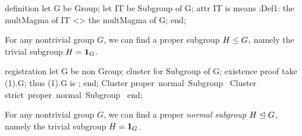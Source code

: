 \nwenddocs{}\endmoddef\nwstartdeflinemarkup{}\nwenddeflinemarkup
definition
  let G be Group;
  let IT be Subgroup of G;
  attr IT is  means
  :Def1:
  the multMagma of IT <> the multMagma of G;
end;
\eatline
{}\nwendcode{}\nwdocspar
\begin{registration}
For any nontrivial group $G$, we can find a proper subgroup $H\leq G$,
namely the trivial subgroup $H=\mathbf{1}_{G}$.
\end{registration}

\nwenddocs{}\endmoddef\nwstartdeflinemarkup{}\nwenddeflinemarkup
registration
  let G be non  Group;
  cluster  for Subgroup of G;
  existence
  proof
    take (1).G;
    thus (1).G is ;
  end;
  \LA{}Cluster \code{}proper\ normal\ Subgroup\edoc{}~{\nwtagstyle{}}\RA{}
  \LA{}Cluster \code{}strict\ proper\ normal\ Subgroup\edoc{}~{\nwtagstyle{}}\RA{}
end;
\nwendcode{}\nwdocspar

\begin{registration}
For any nontrivial group $G$, we can find a proper \emph{normal
subgroup} $H\trianglelefteq G$, namely the trivial subgroup
$H=\mathbf{1}_{G}$.
\end{registration}

